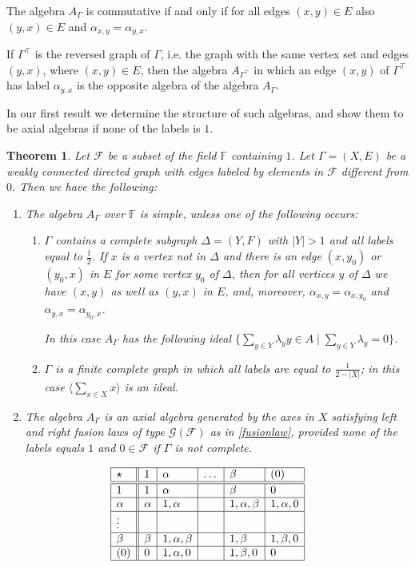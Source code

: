 \documentclass[oneside,a4paper]{amsart} %
\newtheorem{theorem}[proposition]{Theorem}
\theoremstyle{definition}
\begin{document}
The algebra $A_\Gamma$ is commutative if and only if for all edges $(x,y)\in E$ also $(y,x)\in E$ and $\alpha_{x,y}=\alpha_{y,x}$.

If $\Gamma^\top$ is the reversed graph of $\Gamma$, i.e. the graph with the same vertex set and  edges $(y,x)$, where $(x,y)\in E$,
then the algebra $A_{\Gamma^\top}$ in which an edge $(x,y)$ of $\Gamma^\top$ has label $\alpha_{y,x}$ is the opposite  algebra of the algebra $A_\Gamma$.   


In our first result we determine the structure of such algebras, and show them to be axial algebras if none of the labels is $1$.

\begin{theorem}\label{algebrathm}
Let $\mathcal{F}$ be a subset of the field $\mathbb{F}$ containing $1$.
Let $\Gamma=(X,E)$ be a weakly connected directed graph with edges labeled  by elements in $\mathcal{F}$ different from $0$.
Then we have the following:

\begin{enumerate}
\item
The algebra $A_\Gamma$ over $\mathbb{F}$ is simple, unless one of the following occurs:
\begin{enumerate}[\rm(a)]
\item $\Gamma$ contains a complete subgraph $\Delta=(Y,F)$ with $|Y|>1$ and all labels equal to $\frac{1}{2}$.
If $x$ is a vertex not in $\Delta$ and there is an edge $(x,y_0)$ or $(y_0,x)$ in $E$ for some vertex $y_0$ of $\Delta$, then for all
vertices $y$ of $\Delta$ we have $(x,y)$ as well as $(y,x)$ in $E$, and,  moreover, $\alpha_{x,y}=\alpha_{x,y_0}$ and $\alpha_{y,x}=\alpha_{y_0,x}$.

In this case $A_\Gamma$ has the following ideal
$\{\sum_{y\in Y} \lambda_yy\in A\mid \sum_{y\in Y}\lambda_y=0\}$.
\item $\Gamma$ is a finite complete graph in which all labels are equal to $\frac{1}{2-|X|}$; in this case $\langle \sum_{x\in X} x\rangle$ is an ideal.
\end{enumerate}
\item
The algebra $A_{\Gamma}$ is an axial algebra generated by the axes in $X$ satisfying left and right fusion laws of type $\mathcal{G}(\mathcal{F})$ as in \cref{fusionlaw},
provided none of the labels equals $1$ and $0\in \mathcal{F}$ if $\Gamma$ is not complete.
\end{enumerate}
\begin{table}[h]
$$\begin{array}{|l||l|l|l|l|l|}
\hline
\star & 1 &  \alpha&\dots &\beta &(0)\\
\hline\hline
1& 1&\alpha& & \beta&0\\
\hline
\alpha& \alpha& 1,\alpha & &1,\alpha,\beta&1,\alpha,0\\
\hline
\vdots  &&&&&\phantom{a}\\
\hline
\beta &\beta& 1,\alpha,\beta&  & 1,\beta& 1,\beta,0 \\
\hline
(0)     &   0 & 1,\alpha,0&& 1,\beta,0 &0\\
\hline
\end{array}$$


\end{table}
\end{theorem}
\end{document}
